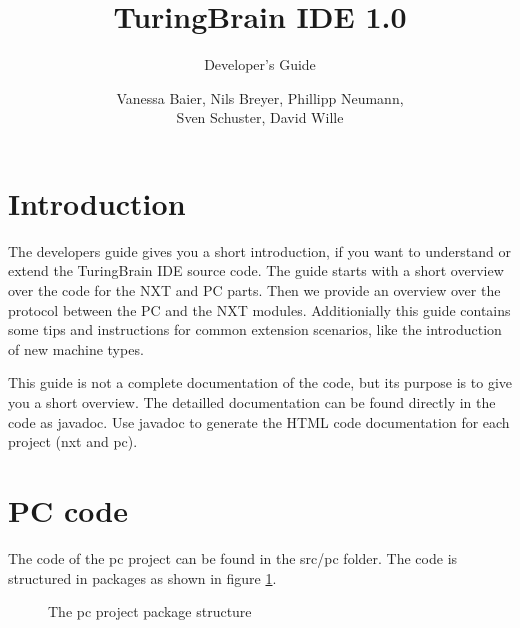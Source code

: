 \documentclass[%
  a4paper,%
  11pt,%
  blue,%
  hyperref	%
  ]{tubsartcl}
\title{TuringBrain IDE \LARGE 1.0}
\subtitle{Developer's Guide}
\author{\small Vanessa Baier, Nils Breyer, Phillipp Neumann,\\ Sven Schuster, David Wille}
\begin{document}
\maketitle[image,logo=right]%

\tableofcontents
\newpage
\section{Introduction}

The developers guide gives you a short introduction, if you want to understand or extend the TuringBrain IDE source code. The guide starts with a short overview over the code for the NXT and PC parts. Then we provide an overview over the protocol between the PC and the NXT modules. Additionially this guide contains some tips and instructions for common extension scenarios, like the introduction of new machine types.

This guide is not a complete documentation of the code, but its purpose is to give you a short overview. The detailled documentation can be found directly in the code as javadoc. Use javadoc to generate the HTML code documentation for each project (nxt and pc).

\section{PC code}

The code of the pc project can be found in the src/pc folder. The code is structured in packages as shown in figure \ref{fig:pc-packages}.
  \begin{figure}[h]
    \centering
    
    \caption{The pc project package structure}
\label{fig:pc-packages}
\end{figure}
\end{document}
